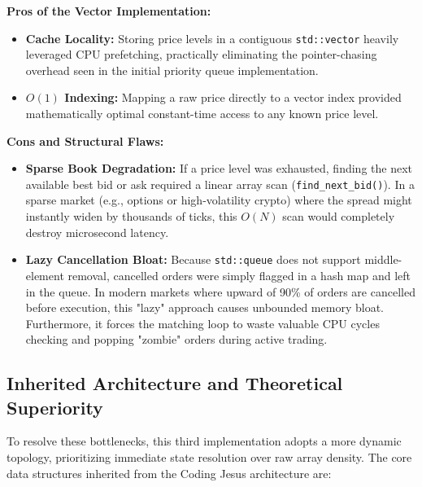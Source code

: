 \documentclass{article}
\begin{document}
\vspace{0.2cm}
\noindent\textbf{Pros of the Vector Implementation:}
\begin{itemize}
    \item \textbf{Cache Locality:} Storing price levels in a contiguous \texttt{std::vector} heavily leveraged CPU prefetching, practically eliminating the pointer-chasing overhead seen in the initial priority queue implementation.
    \item \textbf{$O(1)$ Indexing:} Mapping a raw price directly to a vector index provided mathematically optimal constant-time access to any known price level.
\end{itemize}

\vspace{0.2cm}
\noindent\textbf{Cons and Structural Flaws:}
\begin{itemize}
    \item \textbf{Sparse Book Degradation:} If a price level was exhausted, finding the next available best bid or ask required a linear array scan (\texttt{find\_next\_bid()}). In a sparse market (e.g., options or high-volatility crypto) where the spread might instantly widen by thousands of ticks, this $O(N)$ scan would completely destroy microsecond latency.
    \item \textbf{Lazy Cancellation Bloat:} Because \texttt{std::queue} does not support middle-element removal, cancelled orders were simply flagged in a hash map and left in the queue. In modern markets where upward of 90\% of orders are cancelled before execution, this "lazy" approach causes unbounded memory bloat. Furthermore, it forces the matching loop to waste valuable CPU cycles checking and popping "zombie" orders during active trading.
\end{itemize}

\subsection{Inherited Architecture and Theoretical Superiority}
To resolve these bottlenecks, this third implementation adopts a more dynamic topology, prioritizing immediate state resolution over raw array density. The core data structures inherited from the Coding Jesus architecture are:
\end{document}
